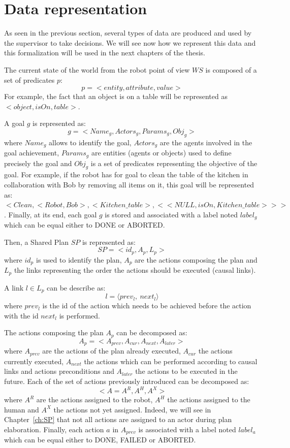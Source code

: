 \documentclass[english,a4paper,11pt,twoside]{StyleThese}
\begin{document}
\section{Data representation}

\label{sec:data}

As seen in the previous section, several types of data are produced and used by the supervisor to take decisions. We will see now how we represent this data and this formalization will be used in the next chapters of the thesis.

The current state of the world from the robot point of view $WS$ is composed of a set of predicates $p$:
$$p = <entity, attribute, value>$$
For example, the fact that an object is on a table will be represented as $<object, isOn, table>$.

A goal $g$ is represented as:
$$g = <Name_g, Actors_g, Params_g, Obj_g>$$
where $Name_g$ allows to identify the goal, $Actors_g$ are the agents involved in the goal achievement, $Params_g$ are entities  (agents or objects) used to define precisely the goal and $Obj_g$ is a set of predicates representing the objective of the goal.
For example, if the robot has for goal to clean the table of the kitchen in collaboration with Bob by removing all items on it, this goal will be represented as:
$<Clean, <Robot, Bob>, <Kitchen\_table>, <<NULL, isOn, Kitchen\_table>>>$.
Finally, at its end, each goal $g$ is stored and associated with a label noted $label_g$ which can be equal either to DONE or ABORTED.

Then, a Shared Plan $SP$ is represented as:
$$SP = <id_p, A_p, L_p>$$
where $id_p$ is used to identify the plan, $A_p$ are the actions composing the plan and $L_p$ the links representing the order the actions should be executed (causal links).

A link $l \in L_p$ can be describe as:
 $$l = \langle prev_l, \ next_l \rangle$$
where $prev_l$ is the id of the action which needs to be achieved before the action with the id $next_l$ is performed. 

The actions composing the plan $A_p$ can be decomposed as:
$$A_p = <A_{prev}, A_{cur}, A_{next}, A_{later}>$$
where $A_{prev}$ are the actions of the plan already executed, $A_{cur}$ the actions currently executed, $A_{next}$ the actions which can be performed according to causal links and actions preconditions and $A_{later}$ the actions to be executed in the future.
Each of the set of actions previously introduced can be decomposed as:
$$<A = A^R, A^H, A^X>$$
where $A^R$ are the actions assigned to the robot, $A^H$ the actions assigned to the human and $A^X$ the actions not yet assigned. Indeed, we will see in Chapter~\ref{ch:SP} that not all actions are assigned to an actor during plan elaboration.
Finally, each action $a$ in $A_{prev}$ is associated with a label noted $label_a$ which can be equal either to DONE, FAILED or ABORTED.
\end{document}
